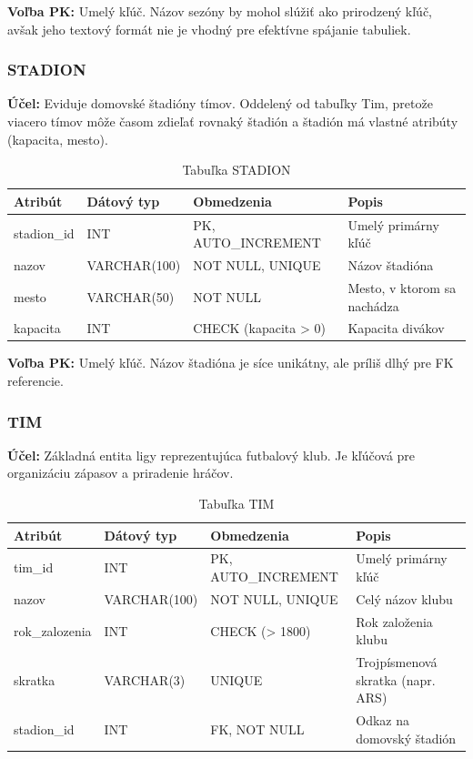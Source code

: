 \documentclass[11pt, a4paper]{article}
\begin{document}
\textbf{Voľba PK:} Umelý kľúč. Názov sezóny by mohol slúžiť ako prirodzený kľúč, avšak jeho textový formát nie je vhodný pre efektívne spájanie tabuliek.

\subsubsection{STADION}
\textbf{Účel:} Eviduje domovské štadióny tímov. Oddelený od tabuľky Tim, pretože viacero tímov môže časom zdieľať rovnaký štadión a štadión má vlastné atribúty (kapacita, mesto).

\begin{table}[H]
    \centering
    \caption{Tabuľka STADION}
    \label{tab:stadion}
    \begin{tabular}{l l l l}
        \toprule
        \textbf{Atribút} & \textbf{Dátový typ} & \textbf{Obmedzenia} & \textbf{Popis} \\
        \midrule
        stadion\_id & INT           & PK, AUTO\_INCREMENT  & Umelý primárny kľúč \\
        nazov       & VARCHAR(100)  & NOT NULL, UNIQUE     & Názov štadióna \\
        mesto       & VARCHAR(50)   & NOT NULL             & Mesto, v ktorom sa nachádza \\
        kapacita    & INT           & CHECK (kapacita > 0) & Kapacita divákov \\
        \bottomrule
    \end{tabular}
\end{table}

\textbf{Voľba PK:} Umelý kľúč. Názov štadióna je síce unikátny, ale príliš dlhý pre FK referencie.

\subsubsection{TIM}
\textbf{Účel:} Základná entita ligy reprezentujúca futbalový klub. Je kľúčová pre organizáciu zápasov a priradenie hráčov.

\begin{table}[H]
    \centering
    \caption{Tabuľka TIM}
    \label{tab:tim}
    \begin{tabular}{l l l l}
        \toprule
        \textbf{Atribút} & \textbf{Dátový typ} & \textbf{Obmedzenia} & \textbf{Popis} \\
        \midrule
        tim\_id        & INT           & PK, AUTO\_INCREMENT & Umelý primárny kľúč \\
        nazov          & VARCHAR(100)  & NOT NULL, UNIQUE    & Celý názov klubu \\
        rok\_zalozenia & INT           & CHECK (> 1800)      & Rok založenia klubu \\
        skratka        & VARCHAR(3)    & UNIQUE              & Trojpísmenová skratka (napr. ARS) \\
        stadion\_id    & INT           & FK, NOT NULL        & Odkaz na domovský štadión \\
        \bottomrule
    \end{tabular}
\end{table}
\end{document}
